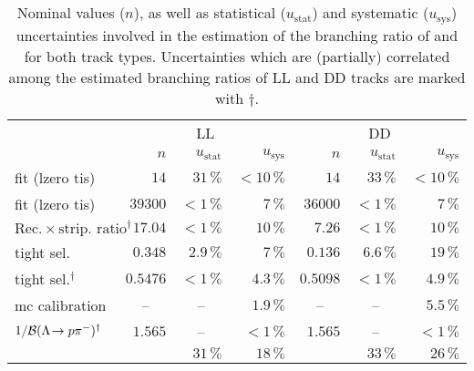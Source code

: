 \begin{table}[htbp]
    \centering
    \caption{Nominal values ($n$), as well as statistical ($u_\text{stat}$) and systematic ($u_\text{sys}$) uncertainties involved in the estimation of the branching ratio of \decay{\Lb}{\Dz\Lz} and \decay{\Lb}{\Dz\proton\pim} for both track types. Uncertainties which are (partially) correlated among the estimated branching ratios of \gls{LL} and \gls{DD} tracks are marked with $\dagger$.}
    \label{tab:br_uLb}
    \begin{tabular}{lrrrrrr}
        \toprule
        & \multicolumn{3}{c}{\gls{LL}} & \multicolumn{3}{c}{\gls{DD}} \\
        & $n$ & $u_\text{stat}$ & $u_\text{sys}$ & $n$ & $u_\text{stat}$ & $u_\text{sys}$ \\
        \midrule
        \decay{\Lb}{\Dz\Lz} fit (\gls{lzero} \gls{tis}) & $14$ & $31\,\%$ & $<10\,\%$ & $14$ & $33\,\%$ & $<10\,\%$ \\
        \decay{\Lb}{\Dz\proton\pim} fit (\gls{lzero} \gls{tis}) & $\num{39300}$ & $<1\,\%$ & $7\,\%$ & $\num{36000}$ & $<1\,\%$ & $7\,\%$ \\
        $\text{Rec.} \times \text{strip. ratio}^\dagger$ & $17.04$ & $<1\,\%$ & $10\,\%$ & $7.26$ & $<1\,\%$ & $10\,\%$ \\
        \decay{\Lb}{\Dz\Lz} tight sel. & $0.348$ & $2.9\,\%$ & $7\,\%$ & $0.136$ & $6.6\,\%$ & $19\,\%$ \\
        \decay{\Lb}{\Dz\proton\pim} tight sel.${}^\dagger$ & $0.5476$ & $<1\,\%$ & $4.3\,\%$ & $0.5098$ & $<1\,\%$ & $4.9\,\%$ \\
        \gls{mc} calibration & \multicolumn{1}{c}{--} & \multicolumn{1}{c}{--} & $1.9\,\%$ & \multicolumn{1}{c}{--} & \multicolumn{1}{c}{--} & $5.5\,\%$ \\
        $1 / {\mathcal{B}}({\Lambda}\!\rightarrow {\ensuremath{p}}{\ensuremath{{\pi}^-}})^\dagger$ \cite{pdg} & $1.565$ & \multicolumn{1}{c}{--} & $<1\,\%$ & $1.565$ & \multicolumn{1}{c}{--} & $<1\,\%$ \\
        \midrule
        && $31\,\%$ & $18\,\%$ && $33\,\%$ & $26\,\%$ \\
        \bottomrule
    \end{tabular}
\end{table}

